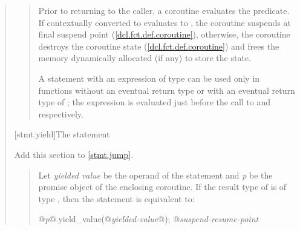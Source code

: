 \begin{quote}
\begin{quote}

%


\pnum
Prior to returning to the caller, a coroutine evaluates
the  predicate. If  contextually converted to  evaluates to
, the coroutine suspends at final suspend point (\ref{dcl.fct.def.coroutine}),
otherwise, the coroutine destroys the coroutine state (\ref{dcl.fct.def.coroutine}) and frees the memory dynamically allocated (if any) to store the state.

\pnum
A  statement with an expression of type \cvvoid
can be used only in functions without an eventual return type 
or with an eventual return type of ; the expression is evaluated just before the call to  and  respectively.


%

\end{quote}

[stmt.yield]{The  statement}%

Add this section to \ref{stmt.jump}.

\begin{quote}

Let \textit{yielded value} be the operand of the  statement and \textit{p} be the promise object of the enclosing coroutine.
If the result type of  is of type \cvvoid, then the  statement is equivalent to:

\begin{codeblock}
  @\textit{p}@.yield_value(@\textit{yielded-value}@);
  @\textit{suspend-resume-point}
\end{codeblock}


\end{quote}
\end{quote}
